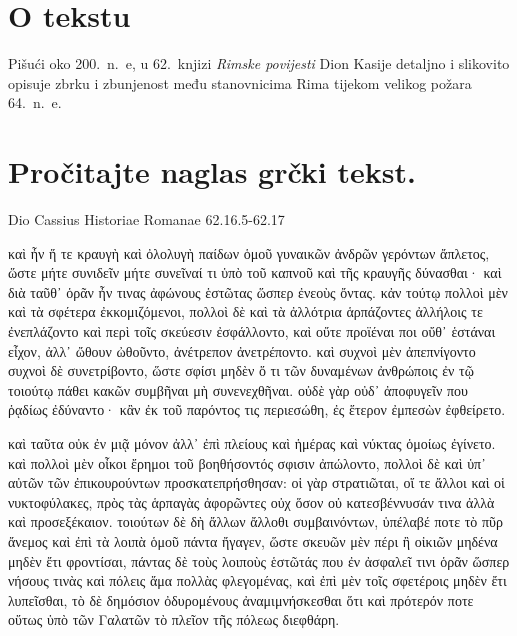 

\section*{O tekstu}

Pišući oko 200.\ n.~e, u 62.\ knjizi \textit{Rimske povijesti} Dion Kasije detaljno i slikovito opisuje zbrku i zbunjenost među stanovnicima Rima tijekom velikog požara 64.\ n.~e.


\section*{Pročitajte naglas grčki tekst.}

Dio Cassius Historiae Romanae 62.16.5-62.17

\medskip


{\large

\begin{greek}

\noindent καὶ ἦν ἥ τε κραυγὴ καὶ ὀλολυγὴ παίδων ὁμοῦ γυναικῶν ἀνδρῶν γερόντων ἄπλετος, ὥστε μήτε συνιδεῖν μήτε συνεῖναί τι ὑπὸ τοῦ καπνοῦ καὶ τῆς κραυγῆς δύνασθαι· καὶ διὰ ταῦθ᾽ ὁρᾶν ἦν τινας ἀφώνους ἑστῶτας ὥσπερ ἐνεοὺς ὄντας. κἀν τούτῳ πολλοὶ μὲν καὶ τὰ σφέτερα ἐκκομιζόμενοι, πολλοὶ δὲ καὶ τὰ ἀλλότρια ἁρπάζοντες ἀλλήλοις τε ἐνεπλάζοντο καὶ περὶ τοῖς σκεύεσιν ἐσφάλλοντο, καὶ οὔτε προϊέναι ποι οὔθ᾽ ἑστάναι εἶχον, ἀλλ᾽ ὤθουν ὠθοῦντο, ἀνέτρεπον ἀνετρέποντο. καὶ συχνοὶ μὲν ἀπεπνίγοντο συχνοὶ δὲ συνετρίβοντο, ὥστε σφίσι μηδὲν ὅ τι τῶν δυναμένων ἀνθρώποις ἐν τῷ τοιούτῳ πάθει κακῶν συμβῆναι μὴ συνενεχθῆναι. οὐδὲ γὰρ οὐδ᾽ ἀποφυγεῖν που ῥᾳδίως ἐδύναντο· κἂν ἐκ τοῦ παρόντος τις περιεσώθη, ἐς ἕτερον ἐμπεσὼν ἐφθείρετο.

\noindent καὶ ταῦτα οὐκ ἐν μιᾷ μόνον ἀλλ᾽ ἐπὶ πλείους καὶ ἡμέρας καὶ νύκτας ὁμοίως ἐγίνετο. καὶ πολλοὶ μὲν οἶκοι ἔρημοι τοῦ βοηθήσοντός σφισιν ἀπώλοντο, πολλοὶ δὲ καὶ ὑπ᾽ αὐτῶν τῶν ἐπικουρούντων προσκατεπρήσθησαν: οἱ γὰρ στρατιῶται, οἵ τε ἄλλοι καὶ οἱ νυκτοφύλακες, πρὸς τὰς ἁρπαγὰς ἀφορῶντες οὐχ ὅσον οὐ κατεσβέννυσάν τινα ἀλλὰ καὶ προσεξέκαιον. τοιούτων δὲ δὴ ἄλλων ἄλλοθι συμβαινόντων, ὑπέλαβέ ποτε τὸ πῦρ ἄνεμος καὶ ἐπὶ τὰ λοιπὰ ὁμοῦ πάντα ἤγαγεν, ὥστε σκευῶν μὲν πέρι ἢ οἰκιῶν μηδένα μηδὲν ἔτι φροντίσαι, πάντας δὲ τοὺς λοιποὺς ἑστῶτάς που ἐν ἀσφαλεῖ τινι ὁρᾶν ὥσπερ νήσους τινὰς καὶ πόλεις ἅμα πολλὰς φλεγομένας, καὶ ἐπὶ μὲν τοῖς σφετέροις μηδὲν ἔτι λυπεῖσθαι, τὸ δὲ δημόσιον ὀδυρομένους ἀναμιμνήσκεσθαι ὅτι καὶ πρότερόν ποτε οὕτως ὑπὸ τῶν Γαλατῶν τὸ πλεῖον τῆς πόλεως διεφθάρη.

\end{greek}

}

